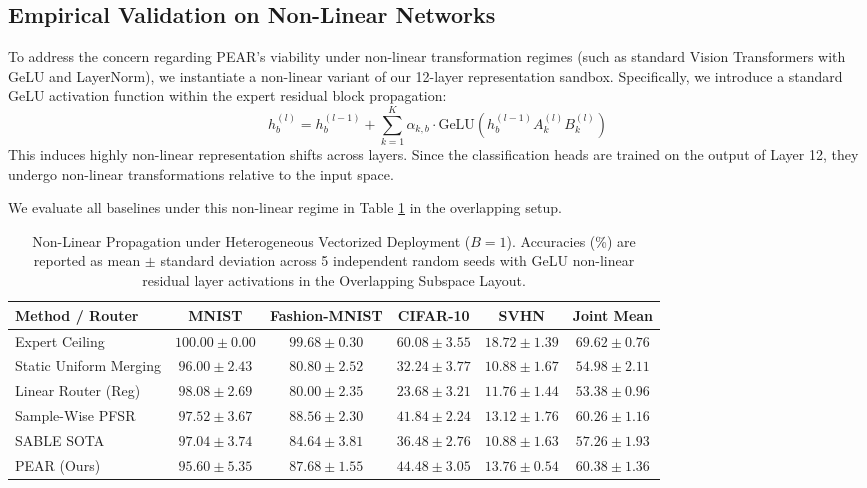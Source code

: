 \subsection{Empirical Validation on Non-Linear Networks}
\label{subsec:nonlinear_experiments}

To address the concern regarding PEAR's viability under non-linear transformation regimes (such as standard Vision Transformers with GeLU and LayerNorm), we instantiate a non-linear variant of our 12-layer representation sandbox. Specifically, we introduce a standard GeLU activation function within the expert residual block propagation:
\begin{equation}
    h_b^{(l)} = h_b^{(l-1)} + \sum_{k=1}^K \alpha_{k, b} \cdot \mathrm{GeLU}\left( h_b^{(l-1)} A_k^{(l)} B_k^{(l)} \right)
\end{equation}
This induces highly non-linear representation shifts across layers. Since the classification heads are trained on the output of Layer 12, they undergo non-linear transformations relative to the input space. 

We evaluate all baselines under this non-linear regime in Table \ref{tab:nonlinear_results} in the overlapping setup. 

\begin{table}[t]
\caption{Non-Linear Propagation under Heterogeneous Vectorized Deployment ($B = 1$). Accuracies (\%) are reported as mean $\pm$ standard deviation across 5 independent random seeds with GeLU non-linear residual layer activations in the Overlapping Subspace Layout.}
\label{tab:nonlinear_results}
\vskip 0.15in
\begin{center}
\begin{small}
\begin{sc}
\begin{tabular}{lccccc}
\toprule
Method / Router & MNIST & Fashion-MNIST & CIFAR-10 & SVHN & Joint Mean \\
\midrule
Expert Ceiling & $100.00 \pm 0.00$ & $99.68 \pm 0.30$ & $60.08 \pm 3.55$ & $18.72 \pm 1.39$ & $\mathbf{69.62 \pm 0.76}$ \\
Static Uniform Merging & $96.00 \pm 2.43$ & $80.80 \pm 2.52$ & $32.24 \pm 3.77$ & $10.88 \pm 1.67$ & $\mathbf{54.98 \pm 2.11}$ \\
Linear Router (Reg) & $98.08 \pm 2.69$ & $80.00 \pm 2.35$ & $23.68 \pm 3.21$ & $11.76 \pm 1.44$ & $\mathbf{53.38 \pm 0.96}$ \\
Sample-Wise PFSR & $97.52 \pm 3.67$ & $88.56 \pm 2.30$ & $41.84 \pm 2.24$ & $13.12 \pm 1.76$ & $\mathbf{60.26 \pm 1.16}$ \\
SABLE SOTA & $97.04 \pm 3.74$ & $84.64 \pm 3.81$ & $36.48 \pm 2.76$ & $10.88 \pm 1.63$ & $\mathbf{57.26 \pm 1.93}$ \\
\midrule
PEAR (Ours) & $95.60 \pm 5.35$ & $87.68 \pm 1.55$ & $44.48 \pm 3.05$ & $13.76 \pm 0.54$ & $\mathbf{60.38 \pm 1.36}$ \\
\bottomrule
\end{tabular}
\end{sc}
\end{small}
\end{center}
\vskip -0.1in
\end{table}

